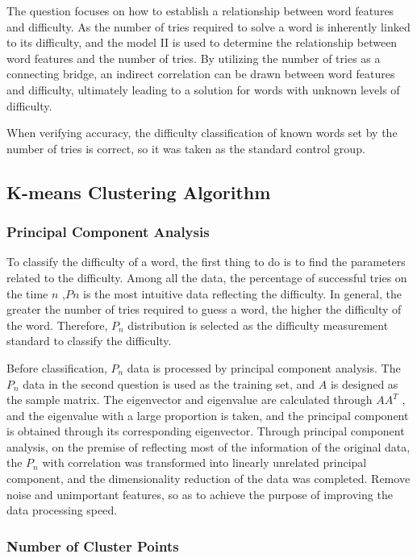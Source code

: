 \documentclass[
  journal=medium,
  manuscript=Report,
  year=2023,
  volume=37,
]{cup-journal}
\begin{document}
The question focuses on how to establish a relationship between word features and difficulty. As the number of tries required to solve a word is inherently linked to its difficulty, and the model II is used to determine the relationship between word features and the number of tries. By utilizing the number of tries as a connecting bridge, an indirect correlation can be drawn between word features and difficulty, ultimately leading to a solution for words with unknown levels of difficulty. 

When verifying accuracy, the difficulty classification of known words set by the number of tries is correct, so it was taken as the standard control group. 

\subsection{K-means Clustering Algorithm}

\subsubsection{Principal Component Analysis}

To classify the difficulty of a word, the first thing to do is to find the parameters related to the difficulty. Among all the data, the percentage of successful tries on the time $n$ ,$Pn$ is the most intuitive data reflecting the difficulty. In general, the greater the number of tries required to guess a word, the higher the difficulty of the word. Therefore, $P_n$ distribution is selected as the difficulty measurement standard to classify the difficulty. 

Before classification, $P_n$ data is processed by principal component analysis. The $P_n$ data in the second question is used as the training set, and $A$ is designed as the sample matrix. The eigenvector and eigenvalue are calculated through $AA^T$ , and the eigenvalue with a large proportion is taken, and the principal component is obtained through its corresponding eigenvector. Through principal component analysis, on the premise of reflecting most of the information of the original data, the $P_n$ with correlation was transformed into linearly unrelated principal component, and the dimensionality reduction of the data was completed. Remove noise and unimportant features, so as to achieve the purpose of improving the data processing speed. 

\subsubsection{Number of Cluster Points}
\end{document}

